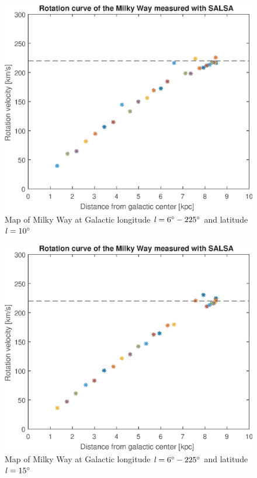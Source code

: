 \documentclass[fleqn,usenatbib]{mnras}
\begin{document}
\begin{figure}
      \includegraphics[width=\columnwidth]{RotationCurve_3}
      \caption{Map of Milky Way at Galactic longitude $\mathit{l}=6\hbox{$^\circ$}-225\hbox{$^\circ$}$ and latitude $\mathit{l}=10\hbox{$^\circ$}$}
      \label{fig:rot-3}
\end{figure}

\begin{figure}
      \includegraphics[width=\columnwidth]{RotationCurve_4}
      \caption{Map of Milky Way at Galactic longitude $\mathit{l}=6\hbox{$^\circ$}-225\hbox{$^\circ$}$ and latitude $\mathit{l}=15\hbox{$^\circ$}$}
      \label{fig:rot-4}
\end{figure}
\end{document}
